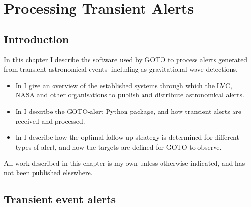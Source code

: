 
\chapter{Processing Transient Alerts}
\label{chap:alerts}


\chaptoc{}


\section{Introduction}
\label{sec:alerts_intro}


\begin{colsection}

In this chapter I describe the software used by GOTO to process alerts generated from transient astronomical events, including as gravitational-wave detections.
%
\begin{itemize}
    \item In  I give an overview of the established systems through which the LVC, NASA and other organisations to publish and distribute astronomical alerts.
    \item In  I describe the GOTO-alert Python package, and how transient alerts are received and processed.
    \item In  I describe how the optimal follow-up strategy is determined for different types of alert, and how the targets are defined for GOTO to observe.
\end{itemize}
%
All work described in this chapter is my own unless otherwise indicated, and has not been published elsewhere.

\end{colsection}


\section{Transient event alerts}
\label{sec:transient_alerts}


